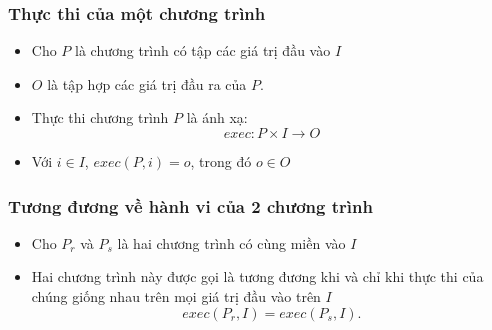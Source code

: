 \documentclass{beamer}
\begin{document}
\begin{frame}
  \frametitle{Thực thi của một chương trình}
\begin{block}{}
	\begin{itemize}
		\item Cho $P$ là chương trình có tập các giá trị đầu vào $I$
		\item $O$ là tập hợp các giá trị đầu ra của $P$. 
		\item Thực thi chương trình $ P $ là ánh xạ: 
		\[exec: P \times I \rightarrow O\]
		\item Với $i \in I$, $exec(P, i) = o$, trong đó $o \in O$
	\end{itemize}
\end{block}
  
\end{frame}


\begin{frame}
  \frametitle{Tương đương về hành vi của 2 chương trình}
  \begin{block}{}
  	\begin{itemize}
  		\item Cho $P_r$ và $P_s$ là hai chương trình có cùng miền vào $I$ 
  		\item Hai chương trình này được gọi là tương đương khi và chỉ
  		khi thực thi của chúng giống nhau trên mọi giá trị đầu vào trên $I$
  		\[exec(P_r, I) = exec(P_s, I).\]
  	\end{itemize}
  \end{block}
 
\end{frame}
\end{document}
